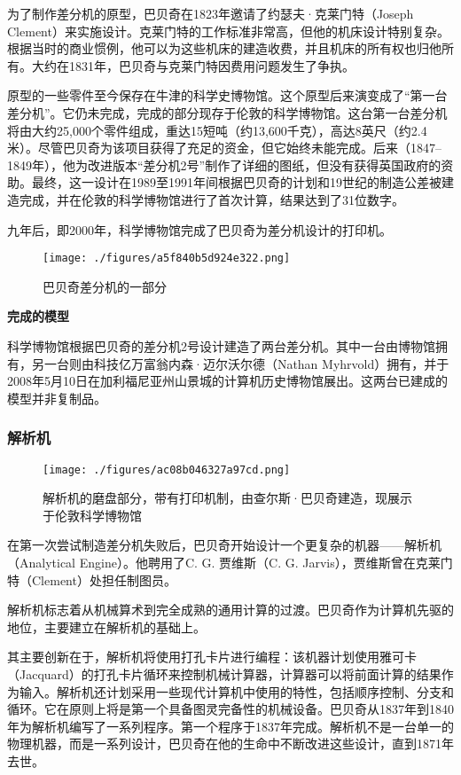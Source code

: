 为了制作差分机的原型，巴贝奇在1823年邀请了约瑟夫·克莱门特（Joseph Clement）来实施设计。克莱门特的工作标准非常高，但他的机床设计特别复杂。根据当时的商业惯例，他可以为这些机床的建造收费，并且机床的所有权也归他所有。大约在1831年，巴贝奇与克莱门特因费用问题发生了争执。

原型的一些零件至今保存在牛津的科学史博物馆。这个原型后来演变成了“第一台差分机”。它仍未完成，完成的部分现存于伦敦的科学博物馆。这台第一台差分机将由大约25,000个零件组成，重达15短吨（约13,600千克），高达8英尺（约2.4米）。尽管巴贝奇为该项目获得了充足的资金，但它始终未能完成。后来（1847–1849年），他为改进版本“差分机2号”制作了详细的图纸，但没有获得英国政府的资助。最终，这一设计在1989至1991年间根据巴贝奇的计划和19世纪的制造公差被建造完成，并在伦敦的科学博物馆进行了首次计算，结果达到了31位数字。

九年后，即2000年，科学博物馆完成了巴贝奇为差分机设计的打印机。
\begin{figure}[ht]
\centering
\texttt{[image: ./figures/a5f840b5d924e322.png]}
\caption{巴贝奇差分机的一部分} \label{fig_CRSBQ_11}
\end{figure}

\textbf{完成的模型}

科学博物馆根据巴贝奇的差分机2号设计建造了两台差分机。其中一台由博物馆拥有，另一台则由科技亿万富翁内森·迈尔沃尔德（Nathan Myhrvold）拥有，并于2008年5月10日在加利福尼亚州山景城的计算机历史博物馆展出。这两台已建成的模型并非复制品。
\subsubsection{解析机}
\begin{figure}[ht]
\centering
\texttt{[image: ./figures/ac08b046327a97cd.png]}
\caption{解析机的磨盘部分，带有打印机制，由查尔斯·巴贝奇建造，现展示于伦敦科学博物馆} \label{fig_CRSBQ_13}
\end{figure}
在第一次尝试制造差分机失败后，巴贝奇开始设计一个更复杂的机器——解析机（Analytical Engine）。他聘用了C. G. 贾维斯（C. G. Jarvis），贾维斯曾在克莱门特（Clement）处担任制图员。

解析机标志着从机械算术到完全成熟的通用计算的过渡。巴贝奇作为计算机先驱的地位，主要建立在解析机的基础上。

其主要创新在于，解析机将使用打孔卡片进行编程：该机器计划使用雅可卡（Jacquard）的打孔卡片循环来控制机械计算器，计算器可以将前面计算的结果作为输入。解析机还计划采用一些现代计算机中使用的特性，包括顺序控制、分支和循环。它在原则上将是第一个具备图灵完备性的机械设备。巴贝奇从1837年到1840年为解析机编写了一系列程序。第一个程序于1837年完成。解析机不是一台单一的物理机器，而是一系列设计，巴贝奇在他的生命中不断改进这些设计，直到1871年去世。
